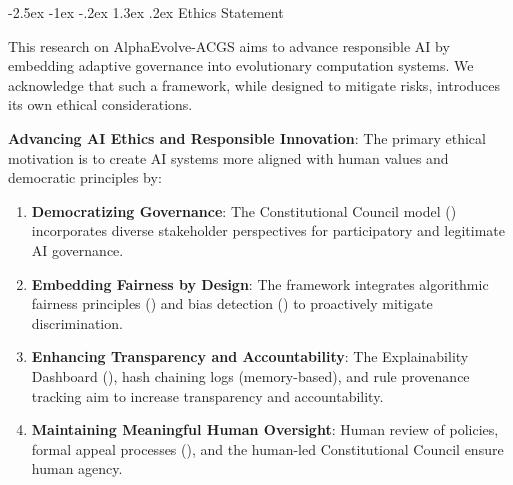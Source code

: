 \documentclass[manuscript,screen,9pt]{acmart}
\makeatletter
\renewcommand\section{\@startsection{section}{1}{\z@}%
  {-2.5ex \@plus -1ex \@minus -.2ex}%
  {1.3ex \@plus.2ex}%
  {\normalfont\Large\bfseries}}
\makeatother
\begin{document}
\section{Ethics Statement}
\label{sec:ethics}

This research on AlphaEvolve-ACGS aims to advance responsible AI by embedding adaptive governance into evolutionary computation systems. We acknowledge that such a framework, while designed to mitigate risks, introduces its own ethical considerations.

\textbf{Advancing AI Ethics and Responsible Innovation}:
The primary ethical motivation is to create AI systems more aligned with human values and democratic principles by:
\begin{enumerate}[leftmargin=*,itemsep=1pt,parsep=1pt]
    \item \textbf{Democratizing Governance}: The Constitutional Council model () incorporates diverse stakeholder perspectives for participatory and legitimate AI governance.
    \item \textbf{Embedding Fairness by Design}: The framework integrates algorithmic fairness principles () and bias detection () to proactively mitigate discrimination.
    \item \textbf{Enhancing Transparency and Accountability}: The Explainability Dashboard (), hash chaining logs (memory-based), and rule provenance tracking aim to increase transparency and accountability.
    \item \textbf{Maintaining Meaningful Human Oversight}: Human review of policies, formal appeal processes (), and the human-led Constitutional Council ensure human agency.
\end{enumerate}
\end{document}
